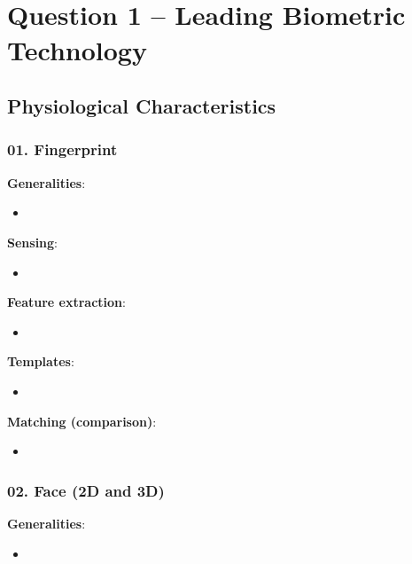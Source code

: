 \documentclass[a4paper]{article}
\title{\vspace{-.25cm} \HWTitle \\ \vspace{.25cm}}
\author{\HWAuthorName}
\begin{document}
\maketitle

\section*{Question 1 -- Leading Biometric Technology} %
\label{sec:question_1}

  \subsection*{Physiological Characteristics}
    \subsubsection*{01. Fingerprint}
      \textbf{Generalities}:
      \begin{itemize}
        \item 
      \end{itemize}

      \textbf{Sensing}:
      \begin{itemize}
        \item 
      \end{itemize}

      \textbf{Feature extraction}:
      \begin{itemize}
        \item 
      \end{itemize}

      \textbf{Templates}:
      \begin{itemize}
        \item 
      \end{itemize}

      \textbf{Matching (comparison)}:
      \begin{itemize}
        \item 
      \end{itemize}
    \subsubsection*{02. Face (2D and 3D)}
      \textbf{Generalities}:
      \begin{itemize}
        \item 
      \end{itemize}
\end{document}
